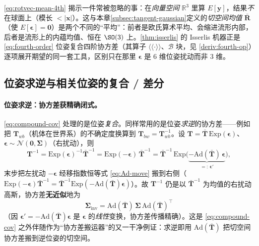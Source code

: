 \begin{insight}
\cref{eq:rotvec-mean-4th} 揭示一件常被忽略的事：在\emph{向量空间} $\mathbb{R}^3$ 里算 $E[\mathbf{y}]$，结果\emph{不}在球面上（模长 $<|\mathbf{x}|$）。这与本章\cref{subsec:tangent-gaussian}定义的\emph{切空间均值} $\bar{\mathbf{R}}$（使 $E[\boldsymbol{\epsilon}]=\mathbf{0}$）是两个不同的“平均”：前者是欧氏算术平均、会缩进流形内部，后者是流形上的内蕴均值、恒在 $\SO(3)$ 上。\cref{thm:isserlis} 的 Isserlis 机器正是 \cref{eq:fourth-order} 位姿复合四阶协方差（其算子 $\langle\!\langle\cdot\rangle\!\rangle$、$\boldsymbol{\mathcal{B}}$ 块，见 \cref{deriv:fourth-op}）逐项展开期望的同一套工具，区别只在那里 $\boldsymbol{\epsilon}$ 是 $6$ 维位姿扰动而非 $3$ 维。
\end{insight}

\subsection{位姿求逆与相关位姿的复合 / 差分}
\label{subsec:correlated-pose}

\paragraph{位姿求逆：协方差获精确闭式。}\cref{eq:compound-cov} 处理的是位姿\emph{复合}。同样常用的是位姿\emph{求逆}的协方差——例如把 $\mathbf{T}_{wb}$（机体在世界系）的不确定度换算到 $\mathbf{T}_{bw}=\mathbf{T}_{wb}^{-1}$。设 $\mathbf{T}=\bar{\mathbf{T}}\,\mathrm{Exp}(\boldsymbol{\epsilon})$、$\boldsymbol{\epsilon}\sim\mathcal{N}(\mathbf{0},\boldsymbol{\Sigma})$（右扰动），则
\begin{equation}
  \mathbf{T}^{-1}=\mathrm{Exp}(\boldsymbol{\epsilon})^{-1}\bar{\mathbf{T}}^{-1}=\mathrm{Exp}(-\boldsymbol{\epsilon})\,\bar{\mathbf{T}}^{-1}
  =\bar{\mathbf{T}}^{-1}\,\mathrm{Exp}\big(\underbrace{-\mathrm{Ad}(\bar{\mathbf{T}})\,\boldsymbol{\epsilon}}_{=:\,\boldsymbol{\epsilon}'}\big),
  \label{eq:pose-inv-derivation}
\end{equation}
末步把左扰动 $-\boldsymbol{\epsilon}$ 经移指数恒等式 \cref{eq:Ad-move} 搬到右侧（$\mathrm{Exp}(-\boldsymbol{\epsilon})\bar{\mathbf{T}}^{-1}=\bar{\mathbf{T}}^{-1}\mathrm{Exp}(-\mathrm{Ad}(\bar{\mathbf{T}})\boldsymbol{\epsilon})$）。故 $\mathbf{T}^{-1}$ 仍是以 $\bar{\mathbf{T}}^{-1}$ 为均值的右扰动高斯，协方差\textbf{无近似}地为
\begin{equation}
  \boxed{\;\boldsymbol{\Sigma}_{\text{inv}}=\mathrm{Ad}(\bar{\mathbf{T}})\,\boldsymbol{\Sigma}\,\mathrm{Ad}(\bar{\mathbf{T}})^\top\;}
  \label{eq:pose-inverse-cov}
\end{equation}
（因 $\boldsymbol{\epsilon}'=-\mathrm{Ad}(\bar{\mathbf{T}})\boldsymbol{\epsilon}$ 是 $\boldsymbol{\epsilon}$ 的\emph{线性}变换，协方差传播精确）。这是 \cref{eq:compound-cov} 之外伴随作为“协方差搬运器”的又一干净例证：求逆即用 $\mathrm{Ad}(\bar{\mathbf{T}})$ 把切空间协方差搬到逆位姿的切空间。

